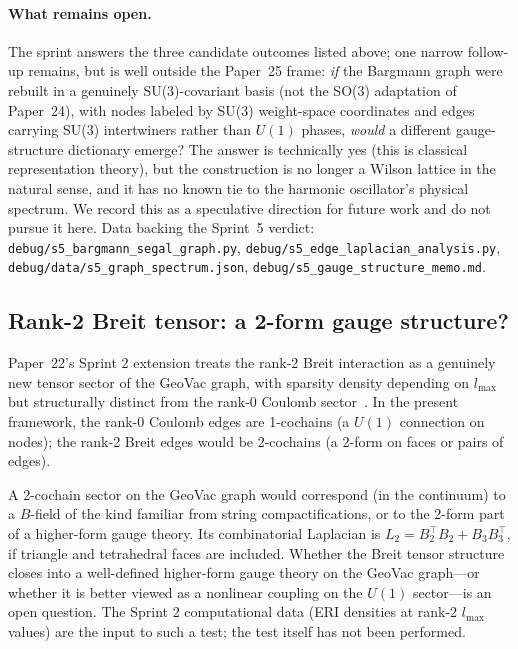 \documentclass[aps,pra,twocolumn,superscriptaddress,longbibliography]{revtex4-2}
\begin{document}
\paragraph*{What remains open.} The sprint answers the three
candidate outcomes listed above; one narrow follow-up remains, but
is well outside the Paper~25 frame: \emph{if} the Bargmann graph
were rebuilt in a genuinely SU(3)-covariant basis (not the SO(3)
adaptation of Paper~24), with nodes labeled by SU(3) weight-space
coordinates and edges carrying SU(3) intertwiners rather than
$U(1)$ phases, \emph{would} a different gauge-structure dictionary
emerge?  The answer is technically yes (this is classical
representation theory), but the construction is no longer a Wilson
lattice in the natural sense, and it has no known tie to the
harmonic oscillator's physical spectrum.  We record this as a
speculative direction for future work and do not pursue it here.
Data backing the Sprint~5 verdict: \texttt{debug/s5\_bargmann\_segal\_graph.py},
\texttt{debug/s5\_edge\_laplacian\_analysis.py},
\texttt{debug/data/s5\_graph\_spectrum.json},
\texttt{debug/s5\_gauge\_structure\_memo.md}.

\subsection{Rank-2 Breit tensor: a 2-form gauge structure?}

Paper~22's Sprint 2 extension treats the rank-2 Breit interaction as
a genuinely new tensor sector of the GeoVac graph, with sparsity
density depending on $l_{\max}$ but structurally distinct from the
rank-0 Coulomb sector~\cite{Paper22}.  In the present framework, the
rank-0 Coulomb edges are 1-cochains (a $U(1)$ connection on nodes);
the rank-2 Breit edges would be 2-cochains (a 2-form on faces or
pairs of edges).

A 2-cochain sector on the GeoVac graph would correspond (in the
continuum) to a $B$-field of the kind familiar from string
compactifications, or to the 2-form part of a higher-form gauge
theory.  Its combinatorial Laplacian is $L_2 = B_2^{\top} B_2 +
B_3 B_3^{\top}$, if triangle and tetrahedral faces are included.
Whether the Breit tensor structure closes into a well-defined
higher-form gauge theory on the GeoVac graph---or whether it is
better viewed as a nonlinear coupling on the $U(1)$ sector---is an
open question.  The Sprint 2 computational data (ERI densities at
rank-2 $l_{\max}$ values) are the input to such a test; the test
itself has not been performed.
\end{document}

